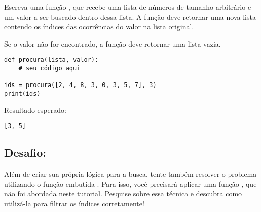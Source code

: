 Escreva uma função  ,  que recebe uma lista de números de tamanho arbitrário e um valor
a ser buscado dentro dessa lista.
A função deve retornar uma nova lista contendo os índices das ocorrências do valor na lista original.

Se o valor não for encontrado, a função deve retornar uma lista vazia.
\begin{verbatim}
def procura(lista, valor):
    # seu código aqui

ids = procura([2, 4, 8, 3, 0, 3, 5, 7], 3)
print(ids)
\end{verbatim}

Resultado esperado:
\begin{verbatim}
[3, 5]
\end{verbatim}

\subsection*{Desafio:}
Além de criar sua própria lógica para a busca, tente também resolver o problema utilizando o função embutida .
Para isso, você precisará aplicar uma função , que não foi abordada neste tutorial.
Pesquise sobre essa técnica e descubra como utilizá-la para filtrar os índices corretamente!


